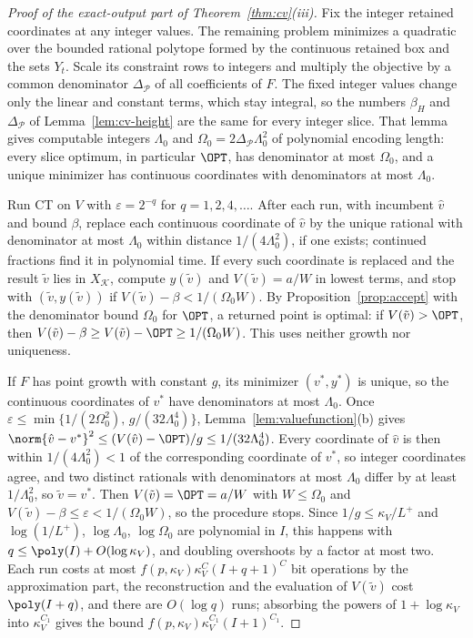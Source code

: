 \begin{proof}[Proof of the exact-output part of Theorem~\ref{thm:cv}(iii)]
Fix the integer retained coordinates at any integer values. The remaining
problem minimizes a quadratic over the bounded rational polytope formed by
the continuous retained box and the sets $Y_t$. Scale its constraint rows
to integers and multiply the objective by a common denominator
$\Delta_{\mathcal P}$ of all coefficients of $F$. The fixed integer values
change only the linear and constant terms, which stay integral, so the
numbers $\beta_H$ and $\Delta_{\mathcal P}$ of Lemma~\ref{lem:cv-height} are
the same for every integer slice. That lemma gives computable integers
$\Lambda_0$ and $\Omega_0=2\Delta_{\mathcal P}\Lambda_0^2$ of
polynomial encoding length: every slice optimum, in particular $\OPT$, has
denominator at most $\Omega_0$, and a unique minimizer has continuous
coordinates with denominators at most $\Lambda_0$.

Run CT on $V$ with $\varepsilon=2^{-q}$ for $q=1,2,4,\ldots$. After each run,
with incumbent $\hat v$ and bound $\beta$, replace each continuous coordinate
of $\hat v$ by the unique rational with denominator at most $\Lambda_0$
within distance $1/(4\Lambda_0^2)$, if one exists; continued fractions find
it in polynomial time. If every such coordinate is replaced and the result
$\tilde v$ lies in $X_{\mathcal K}$, compute $y(\tilde v)$ and
$V(\tilde v)=a/W$ in lowest terms, and stop with $(\tilde v,y(\tilde v))$ if
$V(\tilde v)-\beta<1/(\Omega_0W)$. By Proposition~\ref{prop:accept} with the
denominator bound $\Omega_0$ for $\OPT$, a returned point is optimal: if
$V(\tilde v)>\OPT$, then $V(\tilde v)-\beta\ge V(\tilde v)-\OPT\ge1/(\Omega_0W)$.
This uses neither growth nor uniqueness.

If $F$ has point growth with constant $g$, its minimizer $(v^*,y^*)$ is
unique, so the continuous coordinates of $v^*$ have denominators at most
$\Lambda_0$. Once
$\varepsilon\le\min\{1/(2\Omega_0^2),\,g/(32\Lambda_0^4)\}$,
Lemma~\ref{lem:valuefunction}(b) gives
$\norm{\hat v-v^*}^2\le(V(\hat v)-\OPT)/g\le1/(32\Lambda_0^4)$. Every
coordinate of $\hat v$ is then within $1/(4\Lambda_0^2)<1$ of the
corresponding coordinate of $v^*$, so integer coordinates agree, and two
distinct rationals with denominators at most $\Lambda_0$ differ by at least
$1/\Lambda_0^2$, so $\tilde v=v^*$. Then $V(\tilde v)=\OPT=a/W$ with
$W\le\Omega_0$ and $V(\tilde v)-\beta\le\varepsilon<1/(\Omega_0W)$, so the
procedure stops. Since $1/g\le\kappa_V/L^+$ and $\log(1/L^+)$,
$\log\Lambda_0$, $\log\Omega_0$ are polynomial in $I$, this happens with
$q\le\poly(I)+O(\log\kappa_V)$, and doubling overshoots by a factor at most
two. Each run costs at most $f(p,\kappa_V)\kappa_V^C(I+q+1)^C$ bit operations by
the approximation part, the reconstruction and the evaluation of
$V(\tilde v)$ cost $\poly(I+q)$, and there are $O(\log q)$ runs; absorbing
the powers of $1+\log\kappa_V$ into $\kappa_V^{C_1}$ gives the bound
$f(p,\kappa_V)\kappa_V^{C_1}(I+1)^{C_1}$.
\end{proof}

